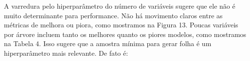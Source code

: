 \begin{figure}[H]
    \centering
    
\end{figure}

A varredura pelo hiperparâmetro do número de variáveis sugere que ele não é muito determinante para performance. Não há movimento claros entre as métricas de melhora ou piora, como mostramos na Figura 13. Poucas variáveis por árvore incluem tanto os melhores quanto os piores modelos, como mostramos na Tabela 4. Isso sugere que a amostra mínima para gerar folha é um hiperparâmetro mais relevante. De fato é:


\begin{figure}[H]
    \centering
\end{figure}

